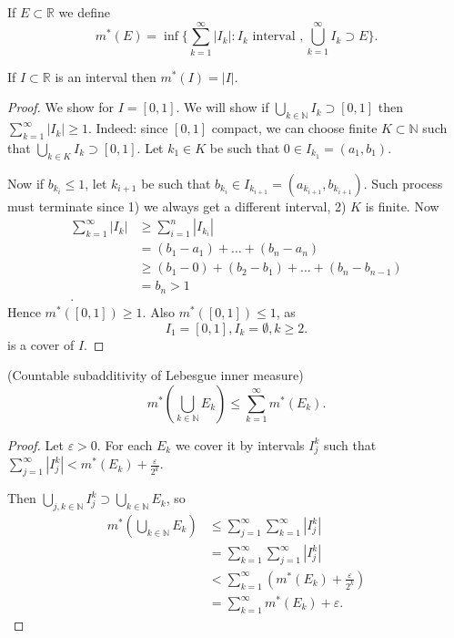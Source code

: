 
\begin{definition}
	If $E \subset \mathbb{R}$ we define 
	\[
		m^*(E) = \operatorname{inf} \{\sum_{k=1}^{\infty} |I_k| : I_k \text{ interval }, \bigcup_{k=1} ^\infty I_k \supset E\} 
	.\] 
\end{definition}

\begin{proposition}
	If $I \subset \mathbb{R}$ is an interval then $m^*(I) = |I|$.
\end{proposition}
\begin{proof}
	We show for $I = [0,1]$. We will show if $\bigcup_{k \in \mathbb{N}} I_k \supset [0,1]$ then $\sum_{k=1}^{\infty} |I_k| \ge 1$. Indeed: since $[0,1]$ compact, we can choose finite $K \subset \mathbb{N}$ such that $\bigcup_{k \in K} I_k \supset [0,1]$. Let $k_1 \in K$ be such that $0 \in I_{k_1} = (a_1, b_1)$.
	
	Now if $b_{k_i} \le 1$, let $k_{i+1}$ be such that $b_{k_i}\in I_{k_{i+1}} = \left( a_{k_{i+1}}, b_{k_{i+1}} \right) $.
	Such process must terminate since 1) we always get a different interval, 2) $K$ is finite. Now
	\begin{align*}
		\sum_{k=1}^{\infty} |I_k| &\ge 
		\sum_{i=1}^{n} \left| I_{k_i} \right| \\
		&= (b_1-a_1) + \ldots + (b_n - a_n) \\
		&\ge (b_1-0) + (b_2-b_1) + \ldots + (b_n - b_{n-1}) \\
		&= b_n >1 \\
	.\end{align*} 
	Hence $m^*([0,1]) \ge 1$. Also $m^*([0,1]) \le 1$, as
	\[
		I_1 = [0,1], I_{k} = \emptyset , k\ge 2
	.\] 
	is a cover of $I$.
\end{proof}

\begin{proposition}(Countable subadditivity of Lebesgue inner measure)
	\[
		m^*\left(\bigcup_{k \in \mathbb{N}} E_k\right) \le  \sum_{k=1}^{\infty} m^*(E_k)
	.\] 
\end{proposition}
\begin{proof}
	Let $\varepsilon>0$. For each $E_k$ we cover it by intervals $I_j^k$ such that $\sum_{j=1}^{\infty} \left| I_j^k \right| < m^*(E_k) + \frac{\varepsilon}{2^k}$.

	Then $\bigcup_{j,k \in \mathbb{N}} I_j^k \supset \bigcup_{k \in \mathbb{N}} E_k$, so
	\begin{align*}
		m^*(\bigcup_{k \in \mathbb{N}} E_k)
		&\le \sum_{j=1}^{\infty} \sum_{k=1}^{\infty} \left| I_j^k \right|  \\
		&= \sum_{k=1}^{\infty} \sum_{j=1}^{\infty} \left| I_j^k \right|  \\
		&< \sum_{k=1}^{\infty} \left( m^*(E_k) + \frac{\varepsilon}{2^k} \right)  \\
		&= \sum_{k=1}^{\infty} m^*(E_k) + \varepsilon
	.\end{align*}
\end{proof}

